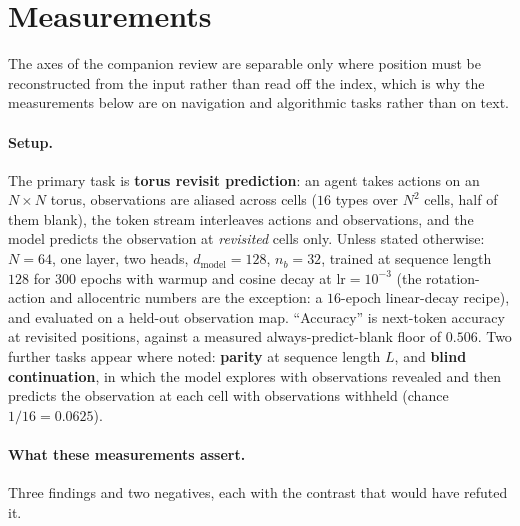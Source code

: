 \documentclass[11pt]{article}
\newcommand{\nb}{n_b}
\begin{document}
\section{Measurements}
\label{sec:measured}

The axes of the companion review are separable only where position must be
reconstructed from the input rather than read off the index, which is why the
measurements below are on navigation and algorithmic tasks rather than on text.

\paragraph{Setup.} The primary task is \textbf{torus revisit prediction}: an agent
takes actions on an $N\times N$ torus, observations are aliased across cells ($16$
types over $N^2$ cells, half of them blank), the token stream interleaves actions and
observations, and the model predicts the observation at \emph{revisited} cells only.
Unless stated otherwise: $N=64$, one layer, two heads, $d_{\mathrm{model}}=128$,
$\nb=32$, trained at sequence length $128$ for $300$ epochs with warmup and cosine
decay at $\mathrm{lr}=10^{-3}$ (the rotation-action and allocentric numbers are the
exception: a $16$-epoch linear-decay recipe), and evaluated on a held-out observation
map.
``Accuracy'' is next-token accuracy at revisited positions, against a measured
always-predict-blank floor of $0.506$. Two further tasks appear where noted:
\textbf{parity} at sequence length $L$, and \textbf{blind continuation}, in which the
model explores with observations revealed and then predicts the observation at each
cell with observations withheld (chance $1/16 = 0.0625$).

\paragraph{What these measurements assert.} Three findings and two negatives, each
with the contrast that would have refuted it.
\end{document}
